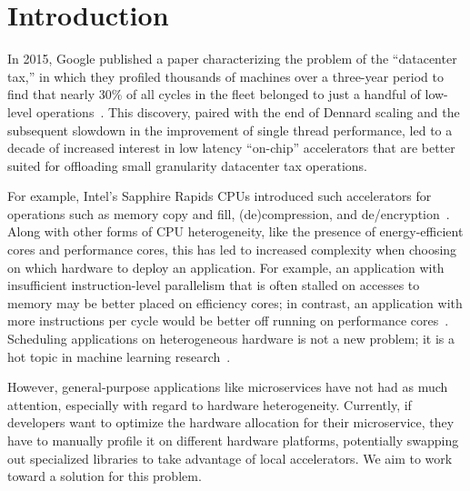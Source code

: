 \section{Introduction}

In 2015, Google published a paper characterizing the problem of the ``datacenter tax,'' in which they profiled thousands of machines over a three-year period to find that nearly 30\% of all cycles in the fleet belonged to just a handful of low-level operations~\cite{kanev2015profiling}.
This discovery, paired with the end of Dennard scaling and the subsequent slowdown in the improvement of single thread performance, led to a decade of increased interest in low latency ``on-chip'' accelerators that are better suited for offloading small granularity datacenter tax operations.

For example, Intel's Sapphire Rapids CPUs introduced such accelerators for operations such as memory copy and fill, (de)compression, and de/encryption~\cite{yuan2024intel}.
Along with other forms of CPU heterogeneity, like the presence of energy-efficient cores and performance cores, this has led to increased complexity when choosing on which hardware to deploy an application.
For example, an application with insufficient instruction-level parallelism that is often stalled on accesses to memory may be better placed on efficiency cores; in contrast, an application with more instructions per cycle would be better off running on performance cores~\cite{kanev2015profiling}.
Scheduling applications on heterogeneous hardware is not a new problem; it is a hot topic in machine learning research~\cite{narayanan2023hetero,subramanya2023sia}.

However, general-purpose applications like microservices have not had as much attention, especially with regard to hardware heterogeneity.
Currently, if developers want to optimize the hardware allocation for their microservice, they have to manually profile it on different hardware platforms, potentially swapping out specialized libraries to take advantage of local accelerators.
We aim to work toward a solution for this problem.
